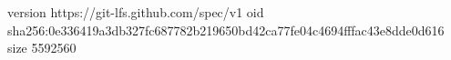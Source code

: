 version https://git-lfs.github.com/spec/v1
oid sha256:0e336419a3db327fc687782b219650bd42ca77fe04c4694fffac43e8dde0d616
size 5592560
